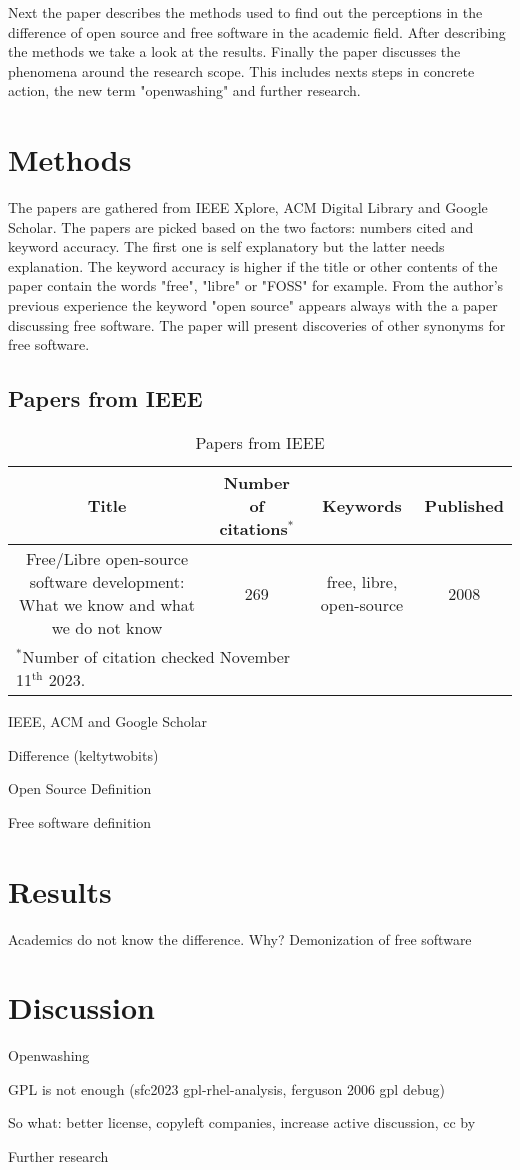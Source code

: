 \documentclass[conference]{IEEEtran}
\begin{document}
Next the paper describes the methods used to find out the perceptions in the difference of open source and free software in the academic field. After describing the methods we take a look at the results. Finally the paper discusses the phenomena around the research scope. This includes nexts steps in concrete action, the new term "openwashing" and further research.

\section{Methods}
The papers are gathered from IEEE Xplore, ACM Digital Library and Google Scholar. The papers are picked based on the two factors: numbers cited and keyword accuracy. The first one is self explanatory but the latter needs explanation. The keyword accuracy is higher if the title or other contents of the paper contain the words "free", "libre" or "FOSS" for example. From the author's previous experience the keyword "open source" appears always with the a paper discussing free software. The paper will present discoveries of other synonyms for free software.  
\subsection{Papers from IEEE}
\begin{table}[htbp]
	\caption{Papers from IEEE}
	\begin{center}
		\begin{tabular}{|c|c|c|c|}
			\hline
			\textbf{Title} & \textbf{Number of citations$^{*}$} & Keywords & Published \\
			\hline
			Free/Libre open-source software development: What we know and what we do not know & 269 & free, libre, open-source & 2008 \\
			\hline
			\multicolumn{2}{l}{$^{*}$Number of citation checked November 11$^{\text{th}}$ 2023.}
		\end{tabular}
		\label{tab1}
	\end{center}
\end{table}

IEEE, ACM and Google Scholar 

Difference (keltytwobits) 

Open Source Definition

Free software definition

\section{Results}
Academics do not know the difference. Why?
Demonization of free software 

\section{Discussion}
Openwashing 

GPL is not enough (sfc2023 gpl-rhel-analysis, ferguson 2006 gpl debug) 

So what: better license, copyleft companies, increase active discussion, cc by 

Further research 

{}
\end{document}
